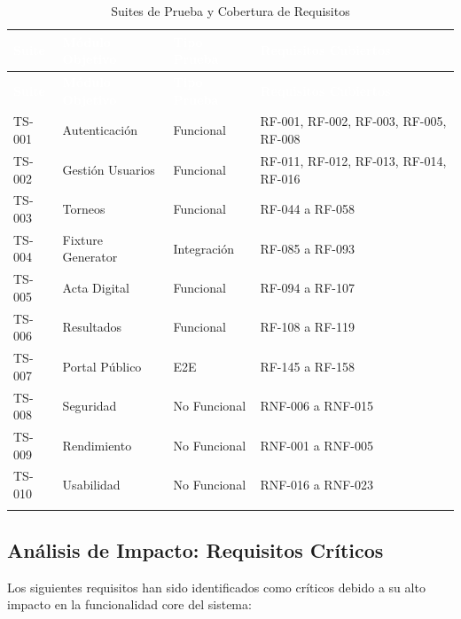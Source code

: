 \documentclass[12pt,a4paper]{article}
\begin{document}
\begin{longtable}{|>{\centering\arraybackslash}p{2cm}|>{\raggedright\arraybackslash}p{3cm}|>{\raggedright\arraybackslash}p{3cm}|>{\raggedright\arraybackslash}p{6cm}|}
\hline
\rowcolor{headercolor}
\textcolor{white}{\textbf{Suite}} & \textcolor{white}{\textbf{Módulo Objetivo}} & \textcolor{white}{\textbf{Tipo Prueba}} & \textcolor{white}{\textbf{Requisitos Cubiertos}} \\
\hline
\endfirsthead
\hline
\rowcolor{headercolor}
\textcolor{white}{\textbf{Suite}} & \textcolor{white}{\textbf{Módulo Objetivo}} & \textcolor{white}{\textbf{Tipo Prueba}} & \textcolor{white}{\textbf{Requisitos Cubiertos}} \\
\hline
\endhead
\hline
\endlastfoot

TS-001 & Autenticación & Funcional & RF-001, RF-002, RF-003, RF-005, RF-008 \\
\hline
\rowcolor{rowgray}
TS-002 & Gestión Usuarios & Funcional & RF-011, RF-012, RF-013, RF-014, RF-016 \\
\hline
TS-003 & Torneos & Funcional & RF-044 a RF-058 \\
\hline
\rowcolor{rowgray}
TS-004 & Fixture Generator & Integración & RF-085 a RF-093 \\
\hline
TS-005 & Acta Digital & Funcional & RF-094 a RF-107 \\
\hline
\rowcolor{rowgray}
TS-006 & Resultados & Funcional & RF-108 a RF-119 \\
\hline
TS-007 & Portal Público & E2E & RF-145 a RF-158 \\
\hline
\rowcolor{rowgray}
TS-008 & Seguridad & No Funcional & RNF-006 a RNF-015 \\
\hline
TS-009 & Rendimiento & No Funcional & RNF-001 a RNF-005 \\
\hline
\rowcolor{rowgray}
TS-010 & Usabilidad & No Funcional & RNF-016 a RNF-023 \\
\hline
\caption{Suites de Prueba y Cobertura de Requisitos}
\end{longtable}

\subsection{Análisis de Impacto: Requisitos Críticos}

Los siguientes requisitos han sido identificados como críticos debido a su alto impacto en la funcionalidad core del sistema:
\end{document}
